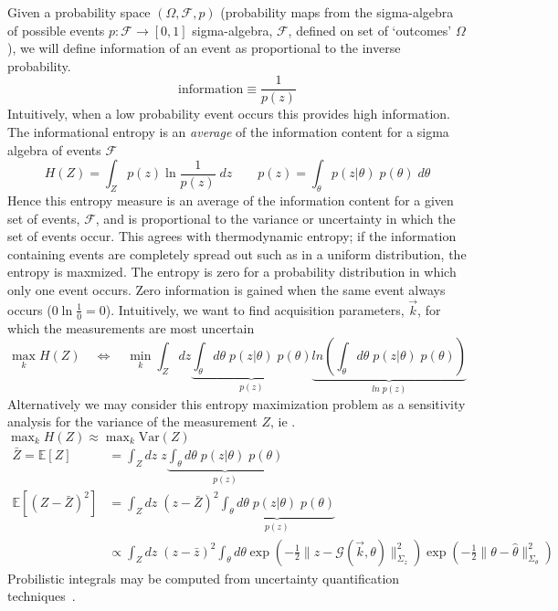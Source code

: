\documentclass{article}         %
\theoremstyle{definition}
\theoremstyle{remark}
\begin{document}
\begin{enumerate}
Given a probability space 
$(\Omega, \mathcal{F},p)$ (probability maps from the
sigma-algebra of possible events $p:\mathcal{F}\rightarrow [0,1]$
sigma-algebra, $\mathcal{F}$, defined on set of `outcomes' $\Omega$
\cite{durrett2010probability}),
we will define information of an event  as
proportional to the inverse probability.
\[
\text{information} \equiv  \frac{1}{p(z)}
\]
Intuitively, when a low probability event occurs this provides high
information.
The informational entropy is an \textit{average}
of the information content for a sigma algebra of events $\mathcal{F}$
\[
H(Z) = \int_Z  p(z) \ln\frac{1}{p(z)} \; dz
\qquad
  p(z) = \int_\theta p(z|\theta) \; p(\theta)\; d\theta 
\]
Hence this entropy measure is an average of the information content
for a given set of events, $\mathcal{F}$, and is proportional to the
variance or uncertainty in which the set of events occur.
This agrees with thermodynamic entropy;
if the information containing events are completely spread out such as in a
uniform distribution, the entropy is maxmized.
The entropy
is zero for a probability distribution in which
only one event occurs. Zero information is gained when the same event
always occurs ($0 \ln\frac{1}{0} = 0$). 
Intuitively, we want to find acquisition parameters,
$\vec{k}$, for which the measurements are most uncertain
\[
\max_k H(Z)
  \quad \Leftrightarrow \quad
\min_k 
    \int_Z   dz \underbrace{\int_\theta  d\theta \; p(z|\theta) \; p(\theta)}_{p(z)}
                \underbrace{ln \left(\int_\theta  d\theta \; p(z|\theta) \; p(\theta)\right)}_{ln \; p(z)}
\]
Alternatively we may consider this entropy maximization problem as a
sensitivity analysis for the variance of the measurement $Z$, ie . 
$ \max_k H(Z) \approx  \max_k \text{Var}(Z) $
\[ \begin{split}
   \bar{Z} = \mathbb{E}[Z]  & = \int_Z   dz \; z
   \underbrace{\int_\theta  d\theta \; p(z|\theta) \; p(\theta)}_{p(z)}
  \\
   \mathbb{E}[ ( Z - \bar{Z} )^2 ]  & = \int_Z   dz \;(z - \bar{Z})^2 
   \underbrace{\int_\theta  d\theta \; p(z|\theta) \; p(\theta)}_{p(z)}
  \\
   &  \propto
    \int_Z   dz \;(z - \bar{z})^2 \int_\theta  d\theta 
 \exp\left( - \frac{1}{2} \|  z- \mathcal{G}(\vec{k},\theta)  \|^2_{\Sigma_z}\right)
 \exp\left( - \frac{1}{2} \|  \theta - \hat{\theta}  \|^2_{\Sigma_\theta}\right)
 \end{split}
\]
Probilistic integrals may be
computed from uncertainty quantification
techniques~\cite{fahrenholtz2013generalised}.

 

\end{enumerate}
\end{document}
